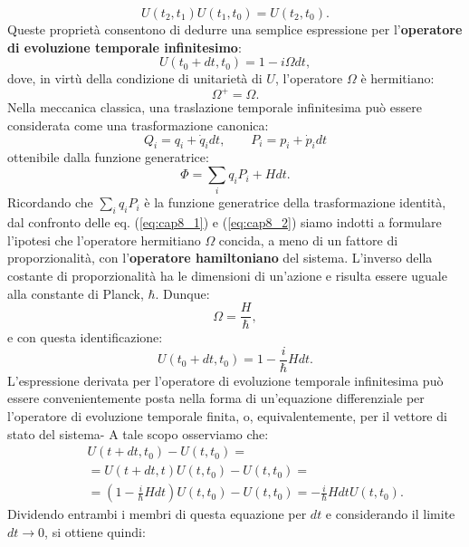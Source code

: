 \documentclass[a4paper,12pt,oneside]{book}
\begin{document}
\begin{equation}
U (t_2,t_1) U(t_1,t_0)=U(t_2,t_0).
\end{equation}
Queste proprietà consentono di dedurre una semplice espressione per l'\textbf{operatore di evoluzione temporale infinitesimo}:
\begin{equation}
U(t_0+dt,t_0) = 1-i\Omega dt,
\label{eq:cap8_1}
\end{equation}
dove, in virtù della condizione di unitarietà di $U$, l'operatore $\Omega$ è hermitiano:
\begin{equation}
\Omega ^+ = \Omega.
\end{equation}
Nella meccanica classica, una traslazione temporale infinitesima può essere considerata come una trasformazione canonica:
\begin{equation}
Q_i = q_i+\dot{q}_idt, \qquad P_i = p_i+\dot{p}_idt
\end{equation}
ottenibile dalla funzione generatrice:
\begin{equation}
\Phi = \sum _i q_iP_i+ Hdt.
\label{eq:cap8_2}
\end{equation}
Ricordando che $\sum _i q_iP_i$ è la funzione generatrice della trasformazione identità, dal confronto delle eq. (\ref{eq:cap8_1}) e (\ref{eq:cap8_2}) siamo indotti a formulare l'ipotesi che l'operatore hermitiano $\Omega$ concida, a meno di un fattore di proporzionalità, con l'\textbf{operatore hamiltoniano} del sistema. L'inverso della costante di proporzionalità ha le dimensioni di un'azione e risulta essere uguale alla constante di Planck, $\hbar$. Dunque:
\begin{equation}
\Omega = \frac{H}{\hbar},
\end{equation}
e con questa identificazione:
\begin{equation}
U(t_0+dt,t_0) =1-\frac{i}{\hbar}Hdt.
\end{equation}
L'espressione derivata per l'operatore di evoluzione temporale infinitesima può essere convenientemente posta nella forma di un'equazione differenziale per l'operatore di evoluzione temporale finita, o, equivalentemente, per il vettore di stato del sistema- A tale scopo osserviamo che:
\begin{eqnarray}
& &U(t+dt,t_0)-U(t,t_0)= \nonumber \\
& &= U(t+dt,t)U(t,t_0)-U(t,t_0)= \\
& &=\left(1-\frac{i}{\hbar}Hdt \right)U(t,t_0)-U(t,t_0)=-\frac{i}{\hbar}Hdt U(t,t_0).\nonumber
\end{eqnarray}
Dividendo entrambi i membri di questa equazione per $dt$ e considerando il limite $dt \longrightarrow 0$, si ottiene quindi:
\end{document}
